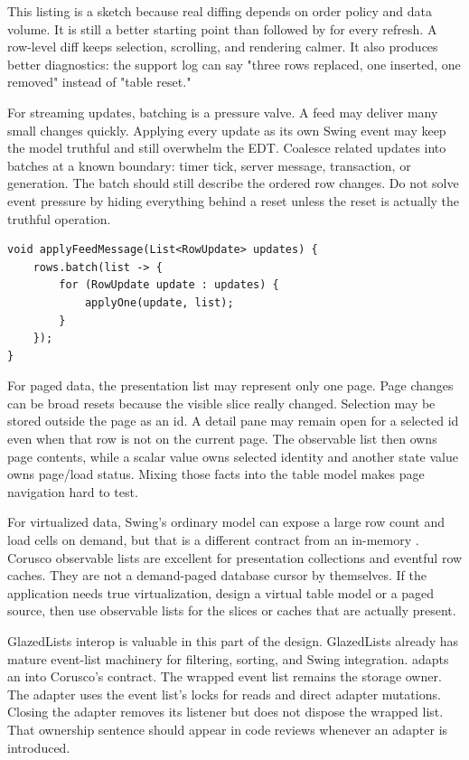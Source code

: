 This listing is a sketch because real diffing depends on order policy and data
volume. It is still a better starting point than  followed by
 for every refresh. A row-level diff keeps selection, scrolling, and
rendering calmer. It also produces better diagnostics: the support log can say
"three rows replaced, one inserted, one removed" instead of "table reset."

For streaming updates, batching is a pressure valve. A feed may deliver many
small changes quickly. Applying every update as its own Swing event may keep the
model truthful and still overwhelm the EDT. Coalesce related updates into
batches at a known boundary: timer tick, server message, transaction, or
generation. The batch should still describe the ordered row changes. Do not
solve event pressure by hiding everything behind a reset unless the reset is
actually the truthful operation.

\begin{lstlisting}[caption={Coalesce feed updates into one ordered batch.}]
void applyFeedMessage(List<RowUpdate> updates) {
    rows.batch(list -> {
        for (RowUpdate update : updates) {
            applyOne(update, list);
        }
    });
}
\end{lstlisting}

For paged data, the presentation list may represent only one page. Page changes
can be broad resets because the visible slice really changed. Selection may be
stored outside the page as an id. A detail pane may remain open for a selected
id even when that row is not on the current page. The observable list then owns
page contents, while a scalar value owns selected identity and another state
value owns page/load status. Mixing those facts into the table model makes page
navigation hard to test.

For virtualized data, Swing's ordinary  model can expose a large row
count and load cells on demand, but that is a different contract from an
in-memory . Corusco observable lists are excellent for
presentation collections and eventful row caches. They are not a demand-paged
database cursor by themselves. If the application needs true virtualization,
design a virtual table model or a paged source, then use observable lists for
the slices or caches that are actually present.

GlazedLists interop is valuable in this part of the design. GlazedLists already
has mature event-list machinery for filtering, sorting, and Swing integration.
 adapts an  into Corusco's
 contract. The wrapped event list remains the storage owner.
The adapter uses the event list's locks for reads and direct adapter mutations.
Closing the adapter removes its listener but does not dispose the wrapped list.
That ownership sentence should appear in code reviews whenever an adapter is
introduced.

